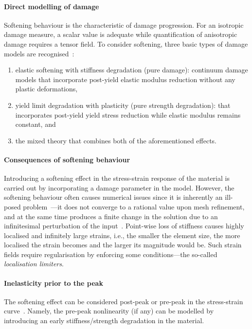 	\paragraph{Direct modelling of damage} Softening behaviour is the characteristic of damage progression. For an isotropic damage measure, a scalar value is adequate while quantification of anisotropic damage requires a tensor field. To consider softening, three basic types of damage models are recognised~\autocite{Bazant.1998}:
		\begin{enumerate}
			\item elastic softening with stiffness degradation (pure damage): continuum damage models that incorporate post-yield elastic modulus reduction without any plastic deformations,
			\item yield limit degradation with plasticity (pure strength degradation): that incorporates post-yield yield stress reduction while elastic modulus remains constant, and
			\item the mixed theory that combines both of the aforementioned effects.
		\end{enumerate}
		
	\paragraph{Consequences of softening behaviour} Introducing a softening effect in the stress-strain response of the material is carried out by incorporating a damage parameter in the model. However, the softening behaviour often causes numerical issues since it is inherently an ill-posed problem~\parencite{Jirasek.2007b}---it does not converge to a rational value upon mesh refinement, and at the same time produces a finite change in the solution due to an infinitesimal perturbation of the input~\autocite{Jirasek.2002}. Point-wise loss of stiffness causes highly localised and infinitely large strains, i.e., the smaller the element size, the more localised the strain becomes and the larger its magnitude would be. Such strain fields require regularisation by enforcing some conditions---the so-called \textit{localisation limiters}.

	\paragraph{Inelasticity prior to the peak} The softening effect can be considered post-peak or pre-peak in the stress-strain curve~\autocite{Bazant.1998}. Namely, the pre-peak nonlinearity (if any) can be modelled by introducing an early stiffness/strength degradation in the material.	

